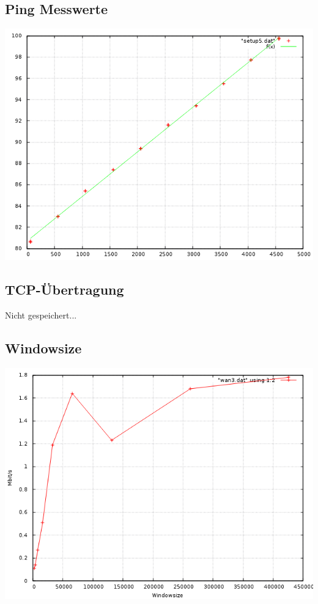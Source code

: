 \documentclass[a4paper,10pt]{article}
\begin{document}
\subsection{Ping Messwerte}
\includegraphics[scale=0.75]{ping_setup_wan3.png}


\subsection{TCP-Übertragung}
Nicht gespeichert...

\subsection{Windowsize}
\includegraphics[scale=0.75]{wan3_windows.png}
\end{document}
